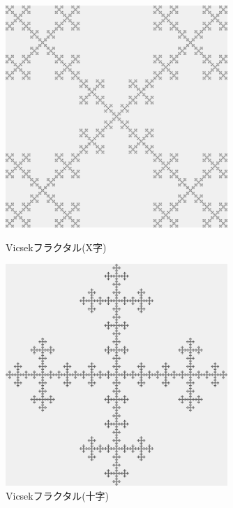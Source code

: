 \documentclass[dvipdfmx]{jsarticle}
\theoremstyle{definition}
\begin{document}
\begin{figure}[H]
    \begin{minipage}{0.49\hsize}
        \centering
        \includegraphics[width=0.75\textwidth]{figure/others/relatives/vicsek_fractal_saltire.png}
        \caption{Vicsekフラクタル(X字)}
        \label{pic_vicfr_x}
    \end{minipage}
    \begin{minipage}{0.49\hsize}
        \centering
        \includegraphics[width=0.75\textwidth]{figure/others/relatives/vicsek_fractal_cross.png}
        \caption{Vicsekフラクタル(十字)}
        \label{pic_vicfr_c}
    \end{minipage}
\end{figure}
\end{document}
